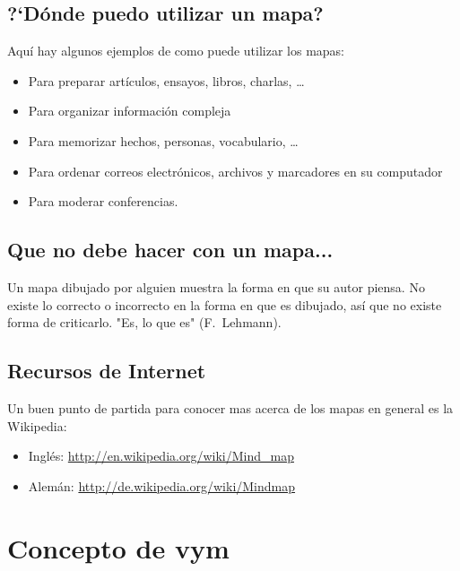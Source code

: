 \documentclass{article}
\newcommand{\vym}{{\sc vym }}
\begin{document}
\subsection{?`D\'onde puedo utilizar un mapa?}
Aqu\'i hay algunos ejemplos de como puede utilizar los mapas:
\begin{itemize}
    \item Para preparar art\'iculos, ensayos, libros, charlas, \ldots
    \item Para organizar informaci\'on compleja
    \item Para memorizar hechos, personas, vocabulario, \ldots
    \item Para ordenar correos electr\'onicos, archivos y marcadores en su computador
    \item Para moderar conferencias.
\end{itemize}

\subsection{Que no debe hacer con un mapa...}
Un mapa dibujado por alguien muestra la forma en que su autor piensa. No existe lo correcto o incorrecto en la forma en que es dibujado, as\'i que no existe forma de criticarlo. "Es, lo que es" ({\sc F.~Lehmann}).

\subsection{Recursos de Internet} 
Un buen punto de partida para conocer mas acerca de los mapas en general es la Wikipedia:
\begin{itemize}
    \item Ingl\'es: 
        \href{http://en.wikipedia.org/wiki/Mind_map}{http://en.wikipedia.org/wiki/Mind\_map}
    \item Alem\'an: 
        \href{http://de.wikipedia.org/wiki/Mindmap}{http://de.wikipedia.org/wiki/Mindmap}
\end{itemize}




\section{Concepto de \vym}
\end{document}
